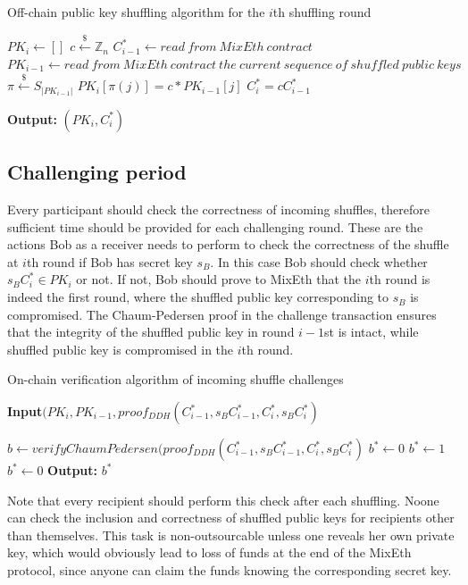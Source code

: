 \documentclass[a4paper]{article}
\theoremstyle{definition}
\begin{document}
\begin{algorithm}
\caption{Off-chain public key shuffling algorithm for the $i$th shuffling round}\label{shufflingoffchain}
\begin{algorithmic}[1]
	\State $PK_{i} \gets []$
	\State $c\stackrel{\$}{\leftarrow}\mathbb{Z}_n$
	\State $C^{*}_{i-1}\leftarrow read\ from\ MixEth\ contract$
	\State $PK_{i-1}\leftarrow read\ from\ MixEth\ contract\ the\ current\ sequence\ of\ shuffled\ public\ keys$
	\State $\pi\stackrel{\$}{\leftarrow}S_{|PK_{i-1}|}$ 
	\State $PK_{i}[\pi(j)]=c*PK_{i-1}[j]$ 
	\EndFor
	\State $C^{*}_{i}=cC^{*}_{i-1}$
	
\hspace*{\algorithmicindent} \textbf{Output:} $(PK_{i},C^{*}_{i})$ 
\end{algorithmic}   
\end{algorithm}
\subsection{Challenging period}
Every participant should check the correctness of incoming shuffles, therefore sufficient time should be provided for each challenging round. These are the actions Bob as a receiver needs to perform to check the correctness of the shuffle at $i$th round if Bob has secret key $s_{B}$. In this case Bob should check whether $s_{B}C^{*}_{i} \in PK_{i}$ or not. If not, Bob should prove to MixEth that the $i$th round is indeed the first round, where the shuffled public key corresponding to $s_{B}$ is compromised. The Chaum-Pedersen proof in the challenge transaction ensures that the integrity of the shuffled public key in round $i-1$st is intact, while shuffled public key is compromised in the $i$th round.   

\begin{algorithm}
	\caption{On-chain verification algorithm of incoming shuffle challenges}\label{verifyingshufflingoffchain}
	\hspace*{\algorithmicindent} \textbf{Input}$(PK_{i}, PK_{i-1}, proof_{DDH}(C^{*}_{i-1},s_{B}C^{*}_{i-1},C^{*}_{i},s_{B}C^{*}_{i})$ \\
	\begin{algorithmic}[1]
		\State $b\leftarrow verifyChaumPedersen(proof_{DDH}(C^{*}_{i-1},s_{B}C^{*}_{i-1}, C^{*}_{i},s_{B}C^{*}_{i})$ 
		\State $b^*\leftarrow0$
		\State $b^*\gets 1$
		\Else
		\State $b^*\gets 0$
		\EndIf
		\hspace*{\algorithmicindent} \textbf{Output:} $b^{*}$ 
	\end{algorithmic}   
\end{algorithm}
Note that every recipient should perform this check after each shuffling. Noone can check the inclusion and correctness of shuffled public keys for recipients other than themselves. This task is non-outsourcable unless one reveals her own private key, which would obviously lead to loss of funds at the end of the MixEth protocol, since anyone can claim the funds knowing the corresponding secret key.  
\end{document}
